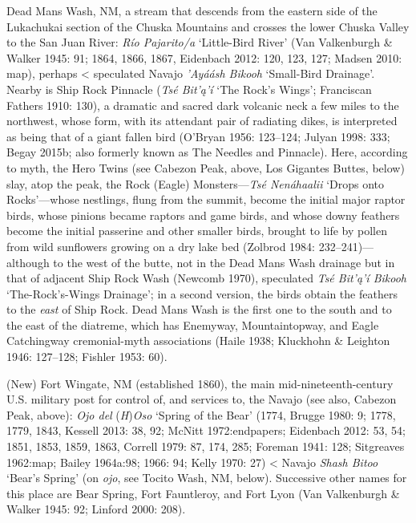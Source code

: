 Dead Mans Wash, NM, a stream that descends from the eastern side of the Lukachukai section of the Chuska Mountains and crosses the lower Chuska Valley to the San Juan River:  \textit{Río Pajarito/a} ‘Little-Bird River’ (Van Valkenburgh \& Walker 1945: 91; 1864, 1866, 1867, Eidenbach 2012: 120, 123, 127; Madsen 2010: map), perhaps {\textless} speculated Navajo \textit{’Ayáásh Bikooh } ‘Small-Bird Drainage’.  Nearby is Ship Rock Pinnacle (\textit{Tsé Bit'ą'í} ‘The Rock’s Wings’; Franciscan Fathers 1910: 130), a dramatic and sacred dark volcanic neck a few miles to the northwest, whose form, with its attendant pair of radiating dikes, is interpreted as being that of a giant fallen bird (O'Bryan 1956: 123–124; Julyan 1998: 333; Begay 2015b; also formerly known as The Needles and Pinnacle).  Here, according to myth, the Hero Twins (see Cabezon Peak, above, Los Gigantes Buttes, below) slay, atop the peak, the Rock (Eagle) Monsters—\textit{Tsé Nenáhaalii} ‘Drops onto Rocks’—whose nestlings, flung from the summit, become the initial major raptor birds, whose pinions became raptors and game birds, and whose downy feathers become the initial passerine and other smaller birds, brought to life by pollen from wild sunflowers growing on a dry lake bed (Zolbrod 1984: 232–241)---although to the west of the butte, not in the Dead Mans Wash drainage but in that of adjacent Ship Rock Wash (Newcomb 1970), speculated \textit{Tsé Bit'ą'í Bikooh}  ‘The-Rock’s-Wings Drainage’; in a second version, the birds obtain the feathers to the \textit{east} of Ship Rock.  Dead Mans Wash is the first one to the south and to the east of the diatreme, which has Enemyway, Mountaintopway, and Eagle Catchingway cremonial-myth associations (Haile 1938; Kluckhohn \& Leighton 1946: 127–128; Fishler 1953: 60).

(New) Fort Wingate, NM (established 1860), the main mid-nineteenth-century U.S. military post for control of, and services to, the Navajo (see also, Cabezon Peak, above):  \textit{Ojo del }(\textit{H})\textit{Oso }‘Spring of the Bear’ (1774, Brugge 1980: 9; 1778, 1779, 1843, Kessell 2013: 38, 92; McNitt 1972:endpapers; Eidenbach 2012: 53, 54; 1851, 1853, 1859, 1863, Correll 1979: 87, 174, 285; Foreman 1941: 128; Sitgreaves 1962:map; Bailey 1964a:98; 1966: 94; Kelly 1970: 27) {\textless} Navajo \textit{Shash Bitoo} ‘Bear's Spring’ (on \textit{ojo}, see Tocito Wash, NM, below).  Successive other names for this place are Bear Spring, Fort Fauntleroy, and Fort Lyon (Van Valkenburgh \& Walker 1945: 92; Linford 2000: 208).

